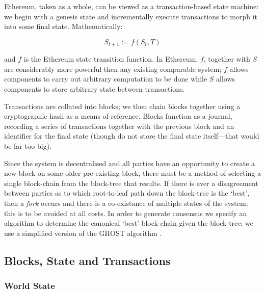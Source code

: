 \documentclass[9pt,oneside]{amsart}
\begin{document}
\begin{multicols}{2}
Ethereum, taken as a whole, can be viewed as a transaction-based state machine: we begin with a genesis state and incrementally execute transactions to morph it into some final state. Mathematically:

\begin{equation}
S_{t+1} := f(S_t, T)
\end{equation}

and $f$ is the Ethereum state transition function. In Ethereum, $f$, together with $S$ are considerably more powerful then any existing comparable system; $f$ allows components to carry out arbitrary computation to be done while $S$ allows components to store arbitrary state between transactions.



Transactions are collated into blocks; we then chain blocks together using a cryptographic hash as a means of reference. Blocks function as a journal, recording a series of transactions together with the previous block and an identifier for the final state (though do not store the final state itself---that would be far too big).

Since the system is decentralised and all parties have an opportunity to create a new block on some older pre-existing block, there must be a method of selecting a single block-chain from the block-tree that results. If there is ever a disagreement between parties as to which root-to-leaf path down the block-tree is the `best', then a \textit{fork} occurs and there is a co-existance of multiple states of the system; this is to be avoided at all costs. In order to generate consensus we specify an algorithm to determine the canonical `best' block-chain given the block-tree; we use a simplified version of the GHOST algorithm \cite{ghost}.

\subsection{Blocks, State and Transactions} \label{ch:bst}

\subsubsection{World State} \label{ch:state}


\end{multicols}
\end{document}
